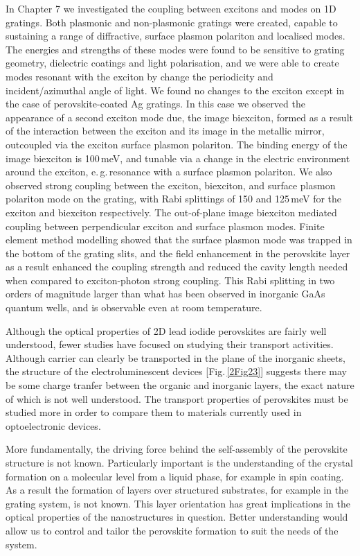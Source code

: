 In Chapter 7 we investigated the coupling between excitons and modes on 1D gratings. Both plasmonic and non-plasmonic gratings were created, capable to sustaining a range of diffractive, surface plasmon polariton and localised modes. The energies and strengths of these modes were found to be sensitive to grating geometry, dielectric coatings and light polarisation, and we were able to create modes resonant with the exciton by change the periodicity and incident/azimuthal angle of light. We found no changes to the exciton except in the case of perovskite-coated Ag gratings. In this case we observed the appearance of a second exciton mode due, the image biexciton, formed as a result of the interaction between the exciton and its image in the metallic mirror, outcoupled via the exciton surface plasmon polariton. The binding energy of the image biexciton is 100\,meV, and tunable via a change in the electric environment around the exciton, e.\,g.\,resonance with a surface plasmon polariton. We also observed strong coupling between the exciton, biexciton, and surface plasmon polariton mode on the grating, with Rabi splittings of 150 and 125\,meV for the exciton and biexciton respectively. The out-of-plane image biexciton mediated coupling between perpendicular exciton and surface plasmon modes. Finite element method modelling showed that the surface plasmon mode was trapped in the bottom of the grating slits, and the field enhancement in the perovskite layer as a result enhanced the coupling strength and reduced the cavity length needed when compared to exciton-photon strong coupling. This Rabi splitting in two orders of magnitude larger than what has been observed in inorganic GaAs quantum wells, and is observable even at room temperature.

Although the optical properties of 2D lead iodide perovskites are fairly well understood, fewer studies have focused on studying their transport activities. Although carrier can clearly be transported in the plane of the inorganic sheets, the structure of the electroluminescent devices [Fig.\,\ref{2Fig23}] suggests there may be some charge tranfer between the organic and inorganic layers, the exact nature of which is not well understood. The transport properties of perovskites must be studied more in order to compare them to materials currently used in optoelectronic devices.

More fundamentally, the driving force behind the self-assembly of the perovskite structure is not known. Particularly important is the understanding of the crystal formation on a molecular level from a liquid phase, for example in spin coating. As a result the formation of layers over structured substrates, for example in the grating system, is not known. This layer orientation has great implications in the optical properties of the nanostructures in question. Better understanding would allow us to control and tailor the perovskite formation to suit the needs of the system.